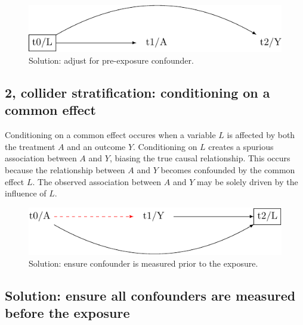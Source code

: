 \documentclass[
  singlecolumn]{report}
\begin{document}
\begin{figure}

{\centering \includegraphics[width=1\textwidth,height=\textheight]{causal-dags_files/figure-pdf/fig-dag-common-cause-solution-1.pdf}

}

\caption{\label{fig-dag-common-cause-solution}Solution: adjust for
pre-exposure confounder.}

\end{figure}

\hypertarget{collider-stratification-conditioning-on-a-common-effect}{%
\subsection{2, collider stratification: conditioning on a common
effect}\label{collider-stratification-conditioning-on-a-common-effect}}

Conditioning on a common effect occures when a variable \(L\) is
affected by both the treatment \(A\) and an outcome \(Y\). Conditioning
on \(L\) creates a spurious association between \(A\) and \(Y\), biasing
the true causal relationship. This occurs because the relationship
between \(A\) and \(Y\) becomes confounded by the common effect \(L\).
The observed association between \(A\) and \(Y\) may be solely driven by
the influence of \(L\).

\begin{figure}

{\centering \includegraphics[width=1\textwidth,height=\textheight]{causal-dags_files/figure-pdf/fig-dag-common-effect-1.pdf}

}

\caption{\label{fig-dag-common-effect}Solution: ensure confounder is
measured prior to the exposure.}

\end{figure}

\hypertarget{solution-ensure-all-confounders-are-measured-before-the-exposure}{%
\subsection{Solution: ensure all confounders are measured before the
exposure}\label{solution-ensure-all-confounders-are-measured-before-the-exposure}}
\end{document}
